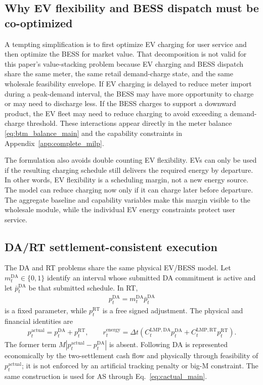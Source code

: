 \documentclass[final,5p,times]{elsarticle}
\newcommand{\DeltaT}{\Delta t}
\newcommand{\DA}{\mathrm{DA}}
\newcommand{\RT}{\mathrm{RT}}
\begin{document}
\subsection{Why EV flexibility and BESS dispatch must be co-optimized}
A tempting simplification is to first optimize EV charging for user service and then optimize the BESS for market value. That decomposition is not valid for this paper's value-stacking problem because EV charging and BESS dispatch share the same meter, the same retail demand-charge state, and the same wholesale feasibility envelope. If EV charging is delayed to reduce meter import during a peak-demand interval, the BESS may have more opportunity to charge or may need to discharge less. If the BESS charges to support a downward product, the EV fleet may need to reduce charging to avoid exceeding a demand-charge threshold. These interactions appear directly in the meter balance \eqref{eq:btm_balance_main} and the capability constraints in Appendix~\ref{app:complete_milp}.

The formulation also avoids double counting EV flexibility. EVs can only be used if the resulting charging schedule still delivers the required energy by departure. In other words, EV flexibility is a scheduling margin, not a new energy source. The model can reduce charging now only if it can charge later before departure. The aggregate baseline and capability variables make this margin visible to the wholesale module, while the individual EV energy constraints protect user service.

\subsection{DA/RT settlement-consistent execution}
The DA and RT problems share the same physical EV/BESS model. Let $m_t^{\DA}\in\{0,1\}$ identify an interval whose submitted DA commitment is active and let $\bar p_t^{\DA}$ be that submitted schedule. In RT,
\begin{align}
p_t^{\DA}=m_t^{\DA}\bar p_t^{\DA}
\label{eq:da_commitment}
\end{align}
is a fixed parameter, while $p_t^{\RT}$ is a free signed adjustment. The physical and financial identities are
\begin{align}
p_t^{\mathrm{actual}}=p_t^{\DA}+p_t^{\RT},\qquad
r_t^{\mathrm{energy}}=\DeltaT\left(C_t^{\mathrm{LMP},\DA}p_t^{\DA}+C_t^{\mathrm{LMP},\RT}p_t^{\RT}\right).
\label{eq:rt_deviation}
\end{align}
The former term $M|p_t^{\mathrm{actual}}-p_t^{\DA}|$ is absent. Following DA is represented economically by the two-settlement cash flow and physically through feasibility of $p_t^{\mathrm{actual}}$; it is not enforced by an artificial tracking penalty or big-M constraint. The same construction is used for AS through Eq.~\eqref{eq:cactual_main}.
\end{document}
